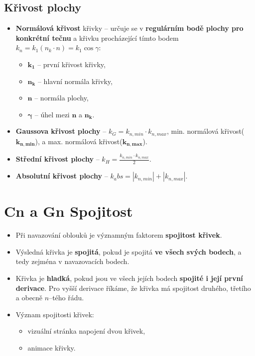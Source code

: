 \subsection{Křivost plochy}
\begin{itemize}
    \item \textbf{Normálová křivost} křivky -- určuje se v \textbf{regulárním bodě plochy pro konkrétní tečnu} a křivku procházející tímto bodem $k_n = k_1(n_k \cdot n) = k_1 \cos{\gamma}$:
          \begin{itemize}
              \item 	 $\mathbf{k_1}$ -- první křivost křivky,
              \item 	 $\mathbf{n_k}$ -- hlavní normála křivky,
              \item 	 $\mathbf{n}$ -- normála plochy,
              \item 	 $\mathbf{\gamma}$ -- úhel mezi $\mathbf{n}$ a $\mathbf{n_k}$.
          \end{itemize}
    \item \textbf{Gaussova křivost plochy} -- $k_G = k_{n,min} \cdot k_{n,max}$, min. normálová křivost($\mathbf{k_{n,min}}$), a max. normálová křivost($\mathbf{k_{n,max}}$).
    \item \textbf{Střední křivost plochy} -- $k_H = \frac{k_{n,min} \cdot k_{n,max}}{2}$.
    \item \textbf{Absolutní křivost plochy} -- $k_abs = |k_{n,min}| + |k_{n,max}|$.
\end{itemize}
\section{Cn a Gn Spojitost}
\begin{itemize}
    \item Při navazování oblouků je významným faktorem \textbf{spojitost křivek}.
    \item Výsledná křivka je \textbf{spojitá}, pokud je spojitá \textbf{ve všech svých bodech}, a tedy zejména v navazovacích bodech.
    \item Křivka je \textbf{hladká}, pokud jsou ve všech jejích bodech \textbf{spojité i její první derivace}. Pro vyšší derivace říkáme, že křivka má spojitost druhého, třetího a obecně $n$--tého řádu.
    \item Význam spojitosti křivek:
          \begin{itemize}
              \item vizuální stránka napojení dvou křivek,
              \item animace křivky.
          \end{itemize}
\end{itemize}
